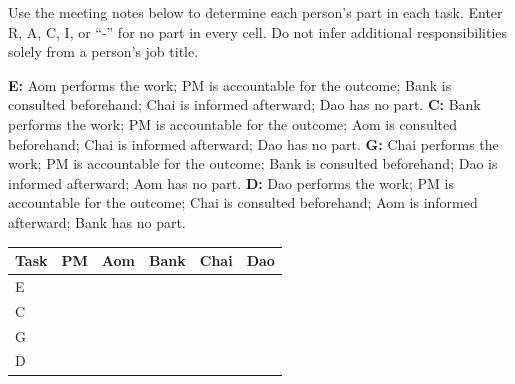{Use the meeting notes below to determine each person's part in each task. Enter R, A, C, I, or “-” for no part in every cell. Do not infer additional responsibilities solely from a person's job title.}
\begin{contenttable}
{\textbf{E:} Aom performs the work; PM is accountable for the outcome; Bank is consulted beforehand; Chai is informed afterward; Dao has no part.}
{\textbf{C:} Bank performs the work; PM is accountable for the outcome; Aom is consulted beforehand; Chai is informed afterward; Dao has no part.}
{\textbf{G:} Chai performs the work; PM is accountable for the outcome; Bank is consulted beforehand; Dao is informed afterward; Aom has no part.}
{\textbf{D:} Dao performs the work; PM is accountable for the outcome; Chai is consulted beforehand; Aom is informed afterward; Bank has no part.}
\end{contenttable}

\begingroup\renewcommand{\tabularxcolumn}[1]{m{#1}}
\begin{tabularx}{\linewidth}{|M{1.1cm}|*{5}{>{\centering\arraybackslash}X|}}\hline
Task & PM & Aom & Bank & Chai & Dao\\\hline
E &\rule{0pt}{.65cm}&&&&\\\hline
C &\rule{0pt}{.65cm}&&&&\\\hline
G &\rule{0pt}{.65cm}&&&&\\\hline
D &\rule{0pt}{.65cm}&&&&\\\hline
\end{tabularx}\endgroup

\newpage



